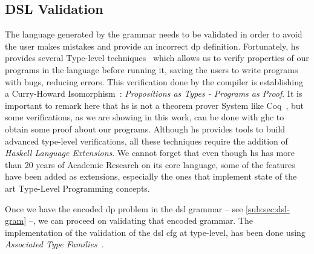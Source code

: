 \subsection{DSL Validation}\label{sub:sec:dsl-val}
The language generated by the grammar needs to be validated in order to avoid the user makes mistakes and provide an incorrect \acrshort{dp} definition.
Fortunately, \acrshort{hs} provides several Type-level techniques~\cite{type-haskell} which allows us to verify properties of our programs in the language before running it, 
saving the users to write programs with bugs, reducing errors. This verification done by the compiler is establishing a Curry-Howard Isomorphism~\cite{curryhoward}: 
\emph{Propositions as Types - Programs as Proof}. It is important to remark here that \acrshort{hs} is not a theorem prover System like Coq~\cite{coq}, but some verifications, as we are showing in this work, can be done with \acrshort{ghc} to obtain some proof about our programs.
Although \acrshort{hs} provides tools to build advanced type-level verifications, all these
techniques require the addition of \emph{Haskell Language Extensions}. We cannot forget that even though \acrshort{hs} has more than 20 years of 
Academic Research on its core language, some of the features have been added as extensions, especially the ones that implement state of the art Type-Level Programming concepts. 

Once we have the encoded \acrshort{dp} problem in the \acrshort{dsl} grammar -- see \autoref{sub:sec:dsl-gram} --, we can proceed on validating that encoded grammar. 
The implementation of the validation of the \acrshort{dsl} \acrshort{cfg} at type-level, has been done using \emph{Associated Type Families}~\cite{associated-types}.


